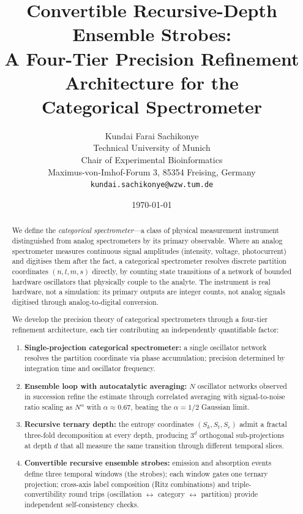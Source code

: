 \documentclass[twocolumn,11pt,a4paper]{article}
\title{\Large\textbf{Convertible Recursive-Depth Ensemble Strobes:\\
A Four-Tier Precision Refinement Architecture for the \\
Categorical Spectrometer}}
\author{Kundai Farai Sachikonye\\[2pt]
\small Technical University of Munich \\
\small Chair of Experimental Bioinformatics\\
\small Maximus-von-Imhof-Forum 3, 85354 Freising, Germany\\
\small \texttt{kundai.sachikonye@wzw.tum.de}}
\date{\today}
\theoremstyle{thmstyle}
\theoremstyle{axiomstyle}
\theoremstyle{definition}
\theoremstyle{remark}
\newcommand{\Sk}{S_{k}}
\newcommand{\St}{S_{t}}
\newcommand{\Se}{S_{e}}
\begin{document}
\maketitle

\begin{abstract}
\noindent
We define the \emph{categorical spectrometer}---a class of physical measurement instrument distinguished from analog spectrometers by its primary observable. Where an analog spectrometer measures continuous signal amplitudes (intensity, voltage, photocurrent) and digitises them after the fact, a categorical spectrometer resolves discrete partition coordinates $(n,l,m,s)$ directly, by counting state transitions of a network of bounded hardware oscillators that physically couple to the analyte. The instrument is real hardware, not a simulation: its primary outputs are integer counts, not analog signals digitised through analog-to-digital conversion.

We develop the precision theory of categorical spectrometers through a four-tier refinement architecture, each tier contributing an independently quantifiable factor:
\begin{enumerate}[label=(\textbf{T\arabic*})]
\item \textbf{Single-projection categorical spectrometer:} a single oscillator network resolves the partition coordinate via phase accumulation; precision determined by integration time and oscillator frequency.
\item \textbf{Ensemble loop with autocatalytic averaging:} $N$ oscillator networks observed in succession refine the estimate through correlated averaging with signal-to-noise ratio scaling as $N^{\alpha}$ with $\alpha\approx 0.67$, beating the $\alpha=1/2$ Gaussian limit.
\item \textbf{Recursive ternary depth:} the entropy coordinates $(\Sk, \St, \Se)$ admit a fractal three-fold decomposition at every depth, producing $3^{d}$ orthogonal sub-projections at depth $d$ that all measure the same transition through different temporal slices.
\item \textbf{Convertible recursive ensemble strobes:} emission and absorption events define three temporal windows (the strobes); each window gates one ternary projection; cross-axis label composition (Ritz combinations) and triple-convertibility round trips (oscillation $\leftrightarrow$ category $\leftrightarrow$ partition) provide independent self-consistency checks.
\end{enumerate}


\end{abstract}
\end{document}
